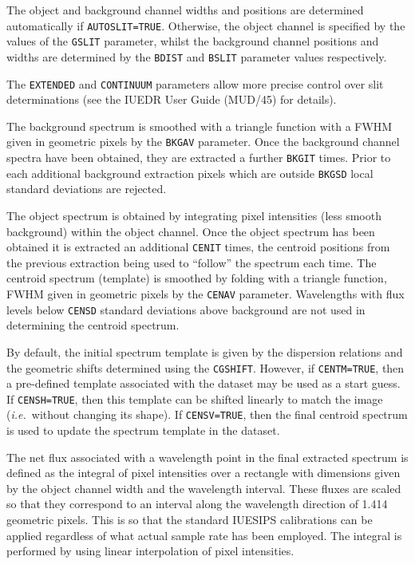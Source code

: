 {{   The object and background channel widths and positions are determined
   automatically if \verb+AUTOSLIT=TRUE+\@.
   Otherwise, the object channel is specified by the values of the
   \verb+GSLIT+ parameter, whilst the background channel positions and
   widths are determined by the \verb+BDIST+ and \verb+BSLIT+ parameter values
   respectively.

   The \verb+EXTENDED+ and \verb+CONTINUUM+ parameters allow more precise
   control over slit determinations (see the IUEDR User Guide (MUD/45) for
   details).

   The background spectrum is smoothed with a triangle function with a
   FWHM given in geometric pixels by the \verb+BKGAV+ parameter.
   Once the background channel spectra have been obtained, they are
   extracted a further \verb+BKGIT+ times.
   Prior to each additional background extraction pixels which are
   outside \verb+BKGSD+ local standard deviations are rejected.

   The object spectrum is obtained by integrating pixel intensities
   (less smooth background) within the object channel.
   Once the object spectrum has been obtained it is extracted an
   additional \verb+CENIT+ times, the centroid positions
   from the previous extraction being used to ``follow'' the
   spectrum each time.
   The centroid spectrum (template) is smoothed by folding with a
   triangle function, FWHM given in geometric
   pixels by the \verb+CENAV+ parameter.
   Wavelengths with flux levels below \verb+CENSD+ standard deviations
   above background are not used in determining the centroid spectrum.

   By default, the initial spectrum template is given by the dispersion
   relations and the geometric shifts determined using the \verb+CGSHIFT+\@.
   However, if \verb+CENTM=TRUE+, then a pre-defined template associated with
   the dataset may be used as a start guess.
   If \verb+CENSH=TRUE+, then this template can be shifted linearly to match the
   image ({\it{i.e.}}\ without changing its shape).
   If \verb+CENSV=TRUE+, then the final centroid spectrum is used to update the
   spectrum template in the dataset.

   The net flux associated with a wavelength point in the final extracted
   spectrum is defined as the integral of pixel intensities over a rectangle
   with dimensions given by the object channel width and the wavelength
   interval.
   These fluxes are scaled so that they correspond to an interval
   along the wavelength direction of 1.414 geometric pixels.
   This is so that the standard IUESIPS calibrations can be applied
   regardless of what actual sample rate has been employed.
   The integral is performed by using linear interpolation of pixel intensities.
}
}

